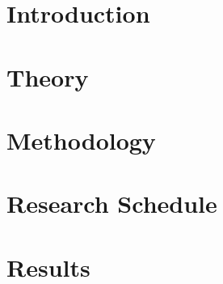 \documentclass[12pt,letterpaper, oneside]{book}
\begin{document}
\frontmatter
\flyleaf                        %
\disclaimerpage                 %
\titlepageAFIT                      %
\approvalpage                   %

%
%
\tableofcontents                %
\listoffigures                  %
\listoftables                   %


\mainmatter
\renewcommand\thechapter{\arabic{chapter}}
\chapter{Introduction}
\label{chap:Introduction}
	
\chapter{Theory}
\label{chap:Theory}
			
\chapter{Methodology}
\label{chap:Methodology}
			
\chapter{Research Schedule}
\label{chap:ResearchSchedule}

\chapter{Results}
\label{chap:Results}
	

\backmatter
\singlespace
%
%
 						

%
\clearpage

%
%
%
\end{document}
